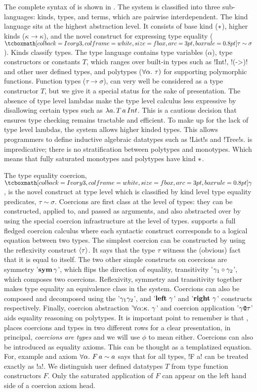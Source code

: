 \documentclass[screen,nonacm]{acmart}
\begin{document}
The complete syntax of \SFC is shown in . The system is classified into three sub-languages: kinds, types, and terms, which are pairwise interdependent. The kind language sits at the highest abstraction level. It consists of base kind ($\ast$), higher kinds ($\kappa \to \kappa$), and the novel construct for expressing type equality ($\shl{\tau \sim \sigma}$). Kinds classify types. The type language contains type variables ($\alpha$), type constructors or constants $T$, which ranges over built-in types such as !Int!, !(->)! and other user defined types, and polytypes ($\forall\alpha.~\tau)$ for supporting polymorphic functions. Function types ($\tau \to \sigma$), can very well be considered as a type constructor $T$, but we give it a special status for the sake of presentation. The absence of type level lambdas make the type level calculus less expressive by disallowing certain types such as $\lambda a.\, T\, a\, Int$. This is a cautious decision that ensures type checking remains tractable and efficient. To make up for the lack of type level lambdas, the system allows higher kinded types. This allows programmers to define inductive algebraic datatypes such as !List!s and !Tree!s. \SFC is impredicative; there is no stratification between polytypes and monotypes. Which means that fully saturated monotypes and polytypes have kind $\ast$.

The type equality coercion, $\shl{\Co}$, is the novel construct at type level which is classified by kind level type equality predicates, $\tau\sim\sigma$. Coercions are first class at the level of types: they can be constructed, applied to, and passed as arguments, and also abstracted over by using the special coercion infrastructure at the level of types. \SFC supports a full fledged coercion calculus where each syntactic construct corresponds to a logical equation between two types. The simplest coercion can be constructed by using the reflexivity construct $\langle{\tau}\rangle$. It says that the type $\tau$ witness the (obvious) fact that it is equal to itself. The two other simple constructs on coercions are symmetry '$\textbf{sym}\,{\gamma}$', which flips the direction of equality, transitivity '${\gamma_1} \circ {\gamma_2}$', which composes two coercions. Reflexivity, symmetry and transitivity together makes type equality an equivalence class in the system. Coercions can also be composed and decomposed using the '$\gamma_1\gamma_2$', and '$\textbf{left}~\gamma$' and '$\textbf{right}~\gamma$' constructs respectively. Finally, coercion abstraction '$\forall\alpha{:}\kappa.~\gamma$' and coercion application '$\gamma\texttt{@}\tau$' aids equality reasoning on polytypes. It is important point to remember is that , places coercions and types in two different rows for a clear presentation, in principal, \emph{coercions are types} and we will use $\phi$ to mean either. Coercions can also be introduced as equality axioms. This can be thought as a templatized equation. For, example and axiom $\forall\alpha.~F\, a \sim a$ says that for all types, !F a! can be treated exactly as !a!. We distinguish user defined datatypes $T$ from type function constructors $F$. Only the saturated application of $F$ can appear on the left hand side of a coercion axiom head.
\end{document}
